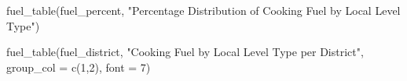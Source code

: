 \documentclass[
  letterpaper,
  DIV=11,
  numbers=noendperiod]{scrartcl}
\newenvironment{Shaded}{\begin{snugshade}}{\end{snugshade}}
\newcommand{\AttributeTok}[1]{\textcolor[rgb]{0.40,0.45,0.13}{#1}}
\newcommand{\DecValTok}[1]{\textcolor[rgb]{0.68,0.00,0.00}{#1}}
\newcommand{\FunctionTok}[1]{\textcolor[rgb]{0.28,0.35,0.67}{#1}}
\newcommand{\NormalTok}[1]{\textcolor[rgb]{0.00,0.23,0.31}{#1}}
\newcommand{\StringTok}[1]{\textcolor[rgb]{0.13,0.47,0.30}{#1}}
\begin{document}
\begin{Shaded}
\begin{Highlighting}[]
\FunctionTok{fuel\_table}\NormalTok{(fuel\_percent, }\StringTok{"Percentage Distribution of Cooking Fuel by Local Level Type"}\NormalTok{)}
\end{Highlighting}
\end{Shaded}

\begin{Shaded}
\begin{Highlighting}[]
\FunctionTok{fuel\_table}\NormalTok{(fuel\_district, }\StringTok{"Cooking Fuel by Local Level Type per District"}\NormalTok{,}
           \AttributeTok{group\_col =} \FunctionTok{c}\NormalTok{(}\DecValTok{1}\NormalTok{,}\DecValTok{2}\NormalTok{),}
           \AttributeTok{font =} \DecValTok{7}\NormalTok{)}
\end{Highlighting}
\end{Shaded}

\begingroup\fontsize{7}{9}\selectfont
\end{document}
